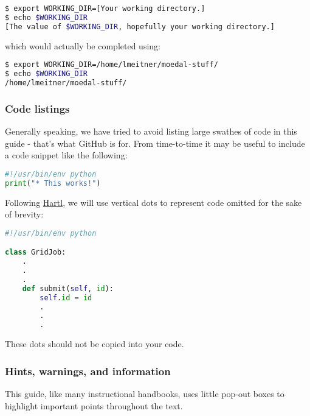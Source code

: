 \begin{lstlisting}[gobble=0,numbers=none,language=bash]
$ export WORKING_DIR=[Your working directory.]
$ echo $WORKING_DIR
[The value of $WORKING_DIR, hopefully your working directory.]
\end{lstlisting} 

which would actually be completed using:

\begin{lstlisting}[gobble=0,numbers=none,language=bash]
$ export WORKING_DIR=/home/lmeitner/moedal-stuff/
$ echo $WORKING_DIR
/home/lmeitner/moedal-stuff/
\end{lstlisting} 

\subsubsection{Code listings}
\label{sec:code-listings}
Generally speaking, we have tried to avoid listing large swathes of code
in this guide - that's what GitHub is for. From
time-to-time it may be useful to include a code snippet like the
following:

\begin{lstlisting}[gobble=0,numbers=none,language=python]
#!/usr/bin/env python
print("* This works!")
\end{lstlisting}

Following \href{https://www.railstutorial.org}{Hartl}, we will use
vertical dots to represent code omitted for the sake of brevity:

\begin{lstlisting}[gobble=0,numbers=none,language=python]
#!/usr/bin/env python

class GridJob:
    .
    .
    .
    def submit(self, id):
        self.id = id
        .
        .
        .
\end{lstlisting}

These dots should not be copied into your code.

\subsubsection{Hints, warnings, and information}
\label{sec:hints-warnings-and-information}
This guide, like many instructional handbooks, uses
little pop-out boxes to highlight important points throughout the text.

